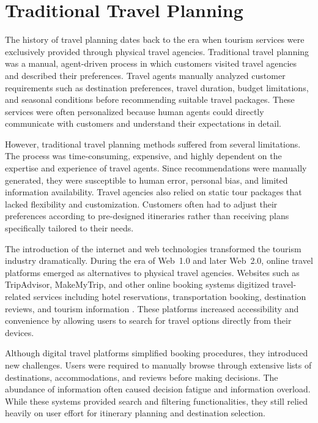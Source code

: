 \section{Traditional Travel Planning}

The history of travel planning dates back to the era when tourism services were exclusively provided through physical travel agencies. Traditional travel planning was a manual, agent-driven process in which customers visited travel agencies and described their preferences. Travel agents manually analyzed customer requirements such as destination preferences, travel duration, budget limitations, and seasonal conditions before recommending suitable travel packages. These services were often personalized because human agents could directly communicate with customers and understand their expectations in detail.

However, traditional travel planning methods suffered from several limitations. The process was time-consuming, expensive, and highly dependent on the expertise and experience of travel agents. Since recommendations were manually generated, they were susceptible to human error, personal bias, and limited information availability. Travel agencies also relied on static tour packages that lacked flexibility and customization. Customers often had to adjust their preferences according to pre-designed itineraries rather than receiving plans specifically tailored to their needs.

The introduction of the internet and web technologies transformed the tourism industry dramatically. During the era of Web~1.0 and later Web~2.0, online travel platforms emerged as alternatives to physical travel agencies. Websites such as TripAdvisor, MakeMyTrip, and other online booking systems digitized travel-related services including hotel reservations, transportation booking, destination reviews, and tourism information \cite{buhalis2008}. These platforms increased accessibility and convenience by allowing users to search for travel options directly from their devices.

Although digital travel platforms simplified booking procedures, they introduced new challenges. Users were required to manually browse through extensive lists of destinations, accommodations, and reviews before making decisions. The abundance of information often caused decision fatigue and information overload. While these systems provided search and filtering functionalities, they still relied heavily on user effort for itinerary planning and destination selection.

